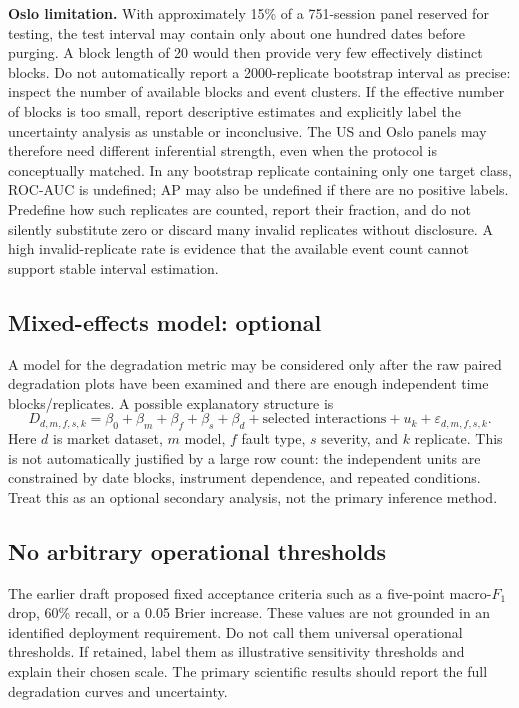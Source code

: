 \documentclass[11pt,a4paper]{article}
\begin{document}
\textbf{Oslo limitation.} With approximately 15\% of a 751-session panel reserved for testing, the test interval may contain only about one hundred dates before purging. A block length of 20 would then provide very few effectively distinct blocks. Do not automatically report a 2000-replicate bootstrap interval as precise: inspect the number of available blocks and event clusters. If the effective number of blocks is too small, report descriptive estimates and explicitly label the uncertainty analysis as unstable or inconclusive. The US and Oslo panels may therefore need different inferential strength, even when the protocol is conceptually matched. In any bootstrap replicate containing only one target class, ROC-AUC is undefined; AP may also be undefined if there are no positive labels. Predefine how such replicates are counted, report their fraction, and do not silently substitute zero or discard many invalid replicates without disclosure. A high invalid-replicate rate is evidence that the available event count cannot support stable interval estimation.

\subsection{Mixed-effects model: optional}

A model for the degradation metric may be considered only after the raw paired degradation plots have been examined and there are enough independent time blocks/replicates. A possible explanatory structure is
\begin{equation}
  D_{d,m,f,s,k}
  =\beta_0+\beta_m+\beta_f+\beta_s+\beta_d
  +\text{selected interactions}+u_k+\varepsilon_{d,m,f,s,k}.
\end{equation}
Here $d$ is market dataset, $m$ model, $f$ fault type, $s$ severity, and $k$ replicate. This is not automatically justified by a large row count: the independent units are constrained by date blocks, instrument dependence, and repeated conditions. Treat this as an optional secondary analysis, not the primary inference method.

\subsection{No arbitrary operational thresholds}

The earlier draft proposed fixed acceptance criteria such as a five-point macro-$F_1$ drop, 60\% recall, or a 0.05 Brier increase. These values are not grounded in an identified deployment requirement. Do not call them universal operational thresholds. If retained, label them as illustrative sensitivity thresholds and explain their chosen scale. The primary scientific results should report the full degradation curves and uncertainty.
\end{document}
